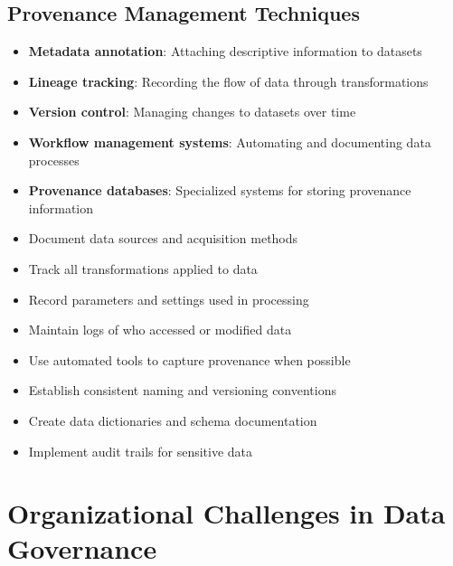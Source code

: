 \documentclass[12pt]{article}
\begin{document}
\subsection{Provenance Management Techniques}
\begin{itemize}
    \item \textbf{Metadata annotation}: Attaching descriptive information to datasets
    \item \textbf{Lineage tracking}: Recording the flow of data through transformations
    \item \textbf{Version control}: Managing changes to datasets over time
    \item \textbf{Workflow management systems}: Automating and documenting data processes
    \item \textbf{Provenance databases}: Specialized systems for storing provenance information
\end{itemize}

\begin{tcolorbox}[colback=green!5!white,colframe=green!75!black,title={Best Practices for Provenance Management}]
\begin{itemize}
    \item Document data sources and acquisition methods
    \item Track all transformations applied to data
    \item Record parameters and settings used in processing
    \item Maintain logs of who accessed or modified data
    \item Use automated tools to capture provenance when possible
    \item Establish consistent naming and versioning conventions
    \item Create data dictionaries and schema documentation
    \item Implement audit trails for sensitive data
\end{itemize}
\end{tcolorbox}

\section{Organizational Challenges in Data Governance}
\end{document}
